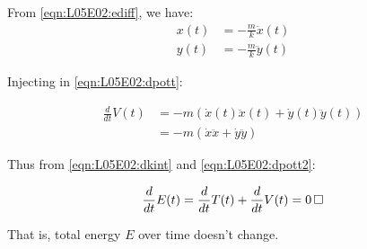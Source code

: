 \documentclass[solutions.tex]{subfiles}
\begin{document}
From \eqref{eqn:L05E02:ediff}, we have:
\begin{equation}
	\begin{aligned}
		x(t) &= -\frac{m}{k}\ddot{x}(t) \\
		y(t) &= -\frac{m}{k}\ddot{y}(t)
	\end{aligned}
\end{equation}

Injecting in \eqref{eqn:L05E02:dpott}:

\begin{equation}
	\label{eqn:L05E02:dpott2}
	\begin{aligned}
		\frac{d}{dt}V(t) &= -m(\dot{x}(t)\ddot{x}(t)+\dot{y}(t)\ddot{y}(t))\\
		~ &= -m(\dot{x}\ddot{x}+\dot{y}\ddot{y})
	\end{aligned}
\end{equation}

Thus from \eqref{eqn:L05E02:dkint} and \eqref{eqn:L05E02:dpott2}:

\begin{equation}
	\frac{d}{dt}E(t) = \frac{d}{dt}T(t) + \frac{d}{dt}V(t) = 0 \qed
\end{equation}

That is, total energy $E$ over time doesn't change.
\end{document}

